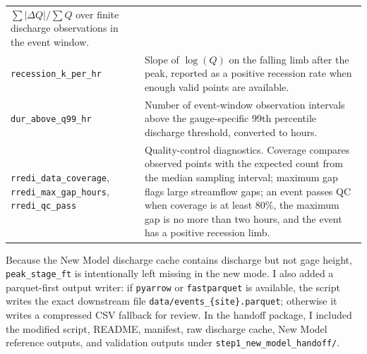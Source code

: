 \documentclass[11pt]{article}
\begin{document}
\begin{table}[htbp]
\begin{tabular}{p{}p{}}
$\sum|\Delta Q|/\sum Q$ over finite discharge observations in the event window. \\
\texttt{recession\_k\_per\_hr} & Slope of $\log(Q)$ on the falling limb after the peak,
reported as a positive recession rate when enough valid points are available. \\
\texttt{dur\_above\_q99\_hr} & Number of event-window observation intervals above the
gauge-specific 99th percentile discharge threshold, converted to hours. \\
\texttt{rredi\_data\_coverage}, \texttt{rredi\_max\_gap\_hours},
\texttt{rredi\_qc\_pass} & Quality-control diagnostics. Coverage compares observed points
with the expected count from the median sampling interval; maximum gap flags large
streamflow gaps; an event passes QC when coverage is at least 80\%, the maximum gap is no
more than two hours, and the event has a positive recession limb. \\
\bottomrule
\end{tabular}
\end{table}

Because the New Model discharge cache contains discharge but not gage height,
\texttt{peak\_stage\_ft} is intentionally left missing in the new mode. I also added a
parquet-first output writer: if \texttt{pyarrow} or \texttt{fastparquet} is available, the
script writes the exact downstream file \texttt{data/events\_\{site\}.parquet}; otherwise it
writes a compressed CSV fallback for review. In the handoff package, I included the modified
script, README, manifest, raw discharge cache, New Model reference outputs, and validation
outputs under \texttt{step1\_new\_model\_handoff/}.
\end{document}
